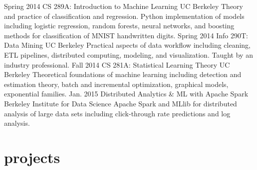 \documentclass[]{friggeri-cv} %
\begin{document}
\begin{entrylist}
\entry
{Spring 2014}
{CS 289A: Introduction to Machine Learning}
{UC Berkeley}
{Theory and practice of classification and regression. Python implementation of models including logistic regression, random forests, neural networks, and boosting methods for classification of MNIST handwritten digits.} 
\entry
{Spring 2014}
{Info 290T: Data Mining}
{UC Berkeley}
{Practical aspects of data workflow including cleaning, ETL pipelines, distributed computing, modeling, and visualization. Taught by an industry professional.}
\entry
{Fall 2014}
{CS 281A: Statistical Learning Theory}
{UC Berkeley}
{Theoretical foundations of machine learning including detection and estimation theory, batch and incremental optimization, graphical models, exponential families.}
\entry
{Jan. 2015}
{Distributed Analytics \& ML with Apache Spark}
{Berkeley Institute for Data Science}
{Apache Spark and MLlib for distributed analysis of large data sets including click-through rate predictions and log analysis.}
\end{entrylist}


\section{projects}
\end{document}
